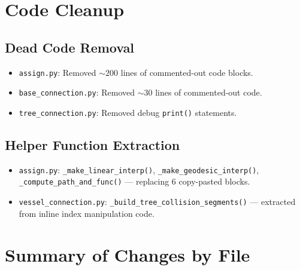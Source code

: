 \documentclass[11pt,a4paper]{article}
\begin{document}
\section{Code Cleanup}

\subsection{Dead Code Removal}

\begin{itemize}[nosep]
    \item \texttt{assign.py}: Removed ${\sim}200$ lines of commented-out code blocks.
    \item \texttt{base\_connection.py}: Removed ${\sim}30$ lines of commented-out code.
    \item \texttt{tree\_connection.py}: Removed debug \texttt{print()} statements.
\end{itemize}

\subsection{Helper Function Extraction}

\begin{itemize}[nosep]
    \item \texttt{assign.py}: \texttt{\_make\_linear\_interp()}, \texttt{\_make\_geodesic\_interp()}, \texttt{\_compute\_path\_and\_func()} --- replacing 6 copy-pasted blocks.
    \item \texttt{vessel\_connection.py}: \texttt{\_build\_tree\_collision\_segments()} --- extracted from inline index manipulation code.
\end{itemize}

\section{Summary of Changes by File}
\end{document}
